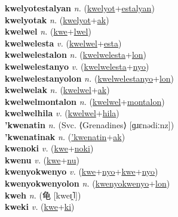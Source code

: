 \textbf{kwelyotestalyan} \textit{n.} (\hyperref[kwelyot]{kwelyot}+\hyperref[estalyan]{estalyan})
 \label{kwelyotestalyan} \\
\textbf{kwelyotak} \textit{n.} (\hyperref[kwelyot]{kwelyot}+\hyperref[ak]{ak})
 \label{kwelyotak} \\
\textbf{kwelwel} \textit{n.} (\hyperref[kwe]{kwe}+\hyperref[lwel]{lwel})
 \label{kwelwel} \\
\textbf{kwelwelesta} \textit{v.} (\hyperref[kwelwel]{kwelwel}+\hyperref[esta]{esta})
 \label{kwelwelesta} \\
\textbf{kwelwelestalon} \textit{n.} (\hyperref[kwelwelesta]{kwelwelesta}+\hyperref[lon]{lon})
 \label{kwelwelestalon} \\
\textbf{kwelwelestanyo} \textit{v.} (\hyperref[kwelwelesta]{kwelwelesta}+\hyperref[nyo]{nyo})
 \label{kwelwelestanyo} \\
\textbf{kwelwelestanyolon} \textit{n.} (\hyperref[kwelwelestanyo]{kwelwelestanyo}+\hyperref[lon]{lon})
 \label{kwelwelestanyolon} \\
\textbf{kwelwelak} \textit{n.} (\hyperref[kwelwel]{kwelwel}+\hyperref[ak]{ak})
 \label{kwelwelak} \\
\textbf{kwelwelmontalon} \textit{n.} (\hyperref[kwelwel]{kwelwel}+\hyperref[montalon]{montalon})
 \label{kwelwelmontalon} \\
\textbf{kwelwelhila} \textit{v.} (\hyperref[kwelwel]{kwelwel}+\hyperref[hila]{hila})
 \label{kwelwelhila} \\
\textbf{'kwenatin} \textit{n.} (Svc. ⟨Grenadines⟩ [ɡɹɛnədiːnz])
 \label{'kwenatin} \\
\textbf{'kwenatinak} \textit{n.} (\hyperref['kwenatin]{'kwenatin}+\hyperref[ak]{ak})
 \label{'kwenatinak} \\
\textbf{kwenoki} \textit{v.} (\hyperref[kwe]{kwe}+\hyperref[noki]{noki})
 \label{kwenoki} \\
\textbf{kwenu} \textit{v.} (\hyperref[kwe]{kwe}+\hyperref[nu]{nu})
 \label{kwenu} \\
\textbf{kwenyokwenyo} \textit{v.} (\hyperref[kwe]{kwe}+\hyperref[nyo]{nyo}+\hyperref[kwe]{kwe}+\hyperref[nyo]{nyo})
 \label{kwenyokwenyo} \\
\textbf{kwenyokwenyolon} \textit{n.} (\hyperref[kwenyokwenyo]{kwenyokwenyo}+\hyperref[lon]{lon})
 \label{kwenyokwenyolon} \\
\textbf{kweh} \textit{n.} ({\chinese{}龟} [kweɪ̯˥])
 \label{kweh} \\
\textbf{kweki} \textit{v.} (\hyperref[kwe]{kwe}+\hyperref[ki]{ki})
 \label{kweki} \\
